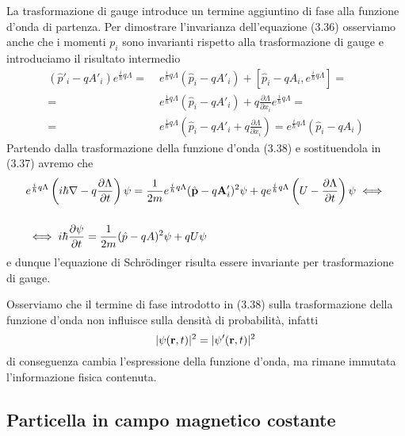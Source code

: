 La trasformazione di gauge introduce un termine aggiuntino di fase alla funzione d'onda di partenza. Per dimostrare l'invarianza dell'equazione (3.36) osserviamo anche che i momenti $p_i$ sono invarianti rispetto alla trasformazione di gauge e introduciamo il risultato intermedio 
\begin{align*}
	(\hat{p}'_i - qA'_i)e^{\frac{i}{\hbar}q \Lambda } = & \;e^{\frac{i}{\hbar}q \Lambda}(\hat{p}_i-qA'_i) + [\hat{p}_i-qA_i,e^{\frac{i}{\hbar}q\Lambda}]  = \\[0.5cm]
	=& \; e^{\frac{i}{\hbar}q\Lambda}(\hat{p}_i-qA'_i) + q \frac{\partial \Lambda}{\partial x_i}e^{\frac{i}{\hbar}q\Lambda} = \\[0.5cm]
	= & \; e^{\frac{i}{\hbar}q\Lambda}\left (\hat{p}_i-qA'_i + q\frac{\partial \Lambda}{\partial x_i} \right) = e^{\frac{i}{\hbar}q\Lambda}(\hat{p}_i - qA_i)   
\end{align*}
Partendo dalla trasformazione della funzione d'onda (3.38) e sostituendola in (3.37) avremo che
\begin{align*}
	  & e^{\frac{i}{\hbar}q\Lambda} \left ( i \hbar \nabla - q \frac{\partial \Lambda}{\partial t}\right)\psi = \frac{1}{2m}e^{\frac{i}{\hbar}q\Lambda}(\hat{\bold{p}}-q\bold{A}'_i)^2 \psi + q e^{\frac{i}{\hbar}q\Lambda}\left ( U - \frac{\partial \Lambda}{\partial t}\right) \psi  \iff \\[0.5cm]
	  & \iff i \hbar \frac{\partial \psi}{\partial t} = \frac{1}{2m} (\hat{p} -qA)^2\psi +qU\psi
\end{align*}
e dunque l'equazione di Schr\"odinger risulta essere invariante per trasformazione di gauge.

Osserviamo  che il termine di fase introdotto in (3.38) sulla trasformazione della funzione d'onda non influisce sulla densit\`a di probabilit\`a, infatti
\begin{equation*}
	|\psi(\bold{r},t)|^2 =|\psi'(\bold{r},t)|^2
\end{equation*}
di conseguenza cambia l'espressione della funzione d'onda, ma rimane immutata l'informazione fisica contenuta.

\subsection{Particella in campo magnetico costante}

